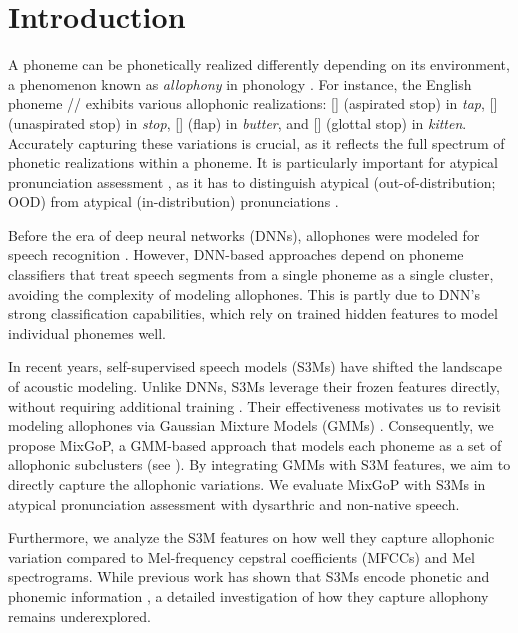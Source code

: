 \section{Introduction}\label{sec:intro}
A phoneme can be phonetically realized differently depending on its environment, a phenomenon known as \textit{allophony} in phonology \citep{twaddell1952phonemes, ladefoged1965nature, collins2019phoneme}. 
For instance, the English phoneme // exhibits various allophonic realizations: [] (aspirated stop) in \textit{tap}, [] (unaspirated stop) in \textit{stop}, [\textipa{\textfishhookr}] (flap) in \textit{butter}, and [] (glottal stop) in \textit{kitten}.
Accurately capturing these variations is crucial, as it reflects the full spectrum of phonetic realizations within a phoneme.
It is particularly important for atypical pronunciation assessment \citep{twaddell1952phonemes, jokisch2009multilingual, vidal2019epadb}, as it has to distinguish atypical (out-of-distribution; OOD) from atypical (in-distribution) pronunciations \citep{yeo23_interspeech}.


Before the era of deep neural networks (DNNs), allophones were modeled for speech recognition \citep{sagayama1989phoneme,lee1990allophone,young1994tree}.
However, DNN-based approaches \citep{hu2015improved, yeo23_interspeech} depend on phoneme classifiers that treat speech segments from a single phoneme as a single cluster, avoiding the complexity of modeling allophones.
This is partly due to DNN's strong classification capabilities, which rely on trained hidden features to model individual phonemes well.




In recent years, self-supervised speech models (S3Ms) have shifted the landscape of acoustic modeling.
Unlike DNNs, S3Ms leverage their frozen features directly, without requiring additional training \citep{feng2023superb,chang2024exploring}.
Their effectiveness motivates us to revisit modeling allophones via Gaussian Mixture Models (GMMs) \citep{bilmes1998gentle,young1994tree}.
Consequently, we propose MixGoP, a GMM-based approach that models each phoneme as a set of allophonic subclusters (see ). 
By integrating GMMs with S3M features, we aim to directly capture the allophonic variations. 
We evaluate MixGoP with S3Ms in atypical pronunciation assessment with dysarthric and non-native speech. 


Furthermore, we analyze the S3M features on how well they capture allophonic variation compared to Mel-frequency cepstral coefficients (MFCCs) and Mel spectrograms.
While previous work has shown that S3Ms encode phonetic \citep{pasad2021layer, wells22_interspeech, abdullah2023information, choi2024self} and phonemic information \citep{martin23_interspeech, choi2024understanding}, a detailed investigation of how they capture allophony remains underexplored.

